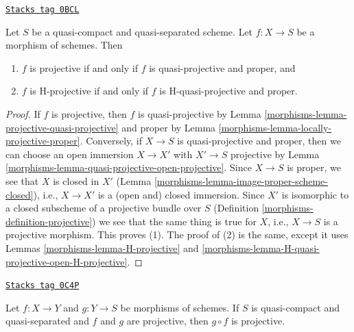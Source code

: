 \begin{lemma}
\label{morphisms-lemma-projective-is-quasi-projective-proper}
\href{https://stacks.math.columbia.edu/tag/0BCL}{\texttt{Stacks tag 0BCL}}

Let $S$ be a quasi-compact and quasi-separated scheme.
Let $f : X \to S$ be a morphism of schemes. Then
\begin{enumerate}
\item $f$ is projective if and only if $f$ is quasi-projective and proper, and
\item $f$ is H-projective if and only if $f$ is H-quasi-projective and proper.
\end{enumerate}
\end{lemma}

\begin{proof}

If $f$ is projective, then $f$ is quasi-projective by
Lemma \ref{morphisms-lemma-projective-quasi-projective} and proper by
Lemma \ref{morphisms-lemma-locally-projective-proper}. Conversely, if
$X \to S$ is quasi-projective and proper, then we can choose
an open immersion $X \to X'$ with $X' \to S$ projective by
Lemma \ref{morphisms-lemma-quasi-projective-open-projective}.
Since $X \to S$ is proper, we see that $X$ is closed in $X'$
(Lemma \ref{morphisms-lemma-image-proper-scheme-closed}), i.e.,
$X \to X'$ is a (open and) closed immersion.
Since $X'$ is isomorphic to a closed subscheme of a projective
bundle over $S$ (Definition \ref{morphisms-definition-projective})
we see that the same thing is true for $X$, i.e.,
$X \to S$ is a projective morphism. This proves (1).
The proof of (2) is the same, except it uses
Lemmas \ref{morphisms-lemma-H-projective} and
\ref{morphisms-lemma-H-quasi-projective-open-H-projective}.
\end{proof}

\begin{lemma}
\label{morphisms-lemma-composition-projective}
\href{https://stacks.math.columbia.edu/tag/0C4P}{\texttt{Stacks tag 0C4P}}

Let $f : X \to Y$ and $g : Y \to S$ be morphisms of schemes.
If $S$ is quasi-compact and quasi-separated and $f$ and $g$ are projective,
then $g \circ f$ is projective.
\end{lemma}

